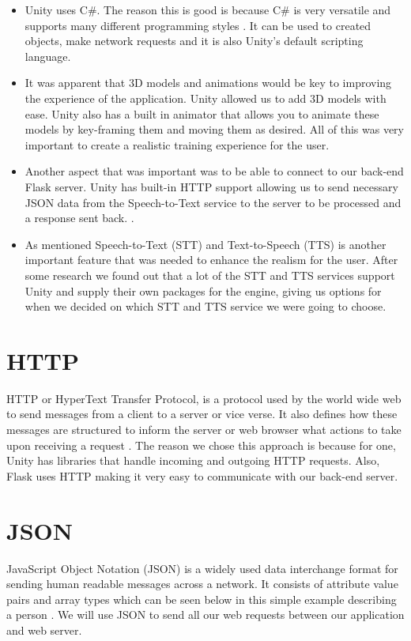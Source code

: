 \begin{itemize}
  \item Unity uses C\#. The reason this is good is because C\# is very versatile and supports many different programming styles \cite{csharp}. It can be used to created objects, make network requests and it is also Unity's default scripting language.
  \item It was apparent that 3D models and animations would be key to improving the experience of the application. Unity allowed us to add 3D models with ease. Unity also has a built in animator that allows you to animate these models by key-framing them and moving them as desired. All of this was very important to create a realistic training experience for the user.
  \item Another aspect that was important was to be able to connect to our back-end Flask server. Unity has built-in HTTP support allowing us to send necessary JSON data from the Speech-to-Text service to the server to be processed and a response sent back. \cite{unitywebrequest}.
  \item As mentioned Speech-to-Text (STT) and Text-to-Speech (TTS) is another important feature that was needed to enhance the realism for the user. After some research we found out that a lot of the STT and TTS services support Unity and supply their own packages for the engine, giving us options for when we decided on which STT and TTS service we were going to choose.
\end{itemize}

\section{HTTP}
HTTP or HyperText Transfer Protocol, is a protocol used by the world wide web to send messages from a client to a server or vice verse. It also defines how these messages are structured to inform the server or web browser what actions to take upon receiving a request \cite{rescorla2000http}. The reason we chose this approach is because for one, Unity has libraries that handle incoming and outgoing HTTP requests. Also, Flask uses HTTP making it very easy to communicate with our back-end server.

\section{JSON}
JavaScript Object Notation (JSON) is a widely used data interchange format for sending human readable messages across a network. It consists of attribute value pairs and array types which can be seen below in this simple example describing a person \cite{chen2014javascript}. We will use JSON to send all our web requests between our application and web server.

